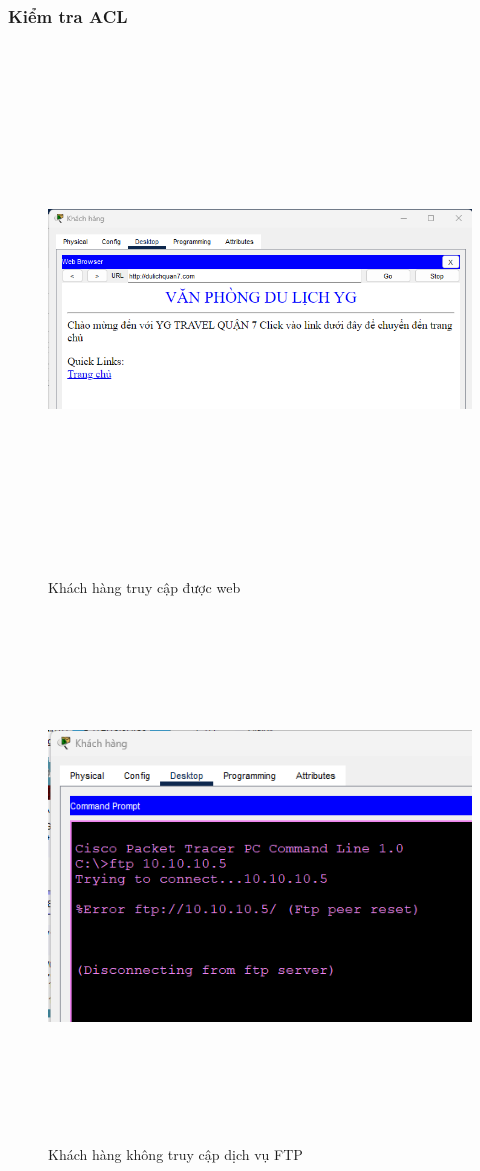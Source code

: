 \documentclass[a4paper, 12pt]{article}
\begin{document}
\subsubsection{Kiểm tra ACL}

\begin{figure}[H]
    \centering
    \includegraphics[width=16cm, height=14cm]{img/4.13.1b.png}
    \caption{Khách hàng truy cập được web }
    \label{hinh4131b}
\end{figure}


\begin{figure}[H]
    \centering
    \includegraphics[width=16cm, height=14cm]{img/4.13.1e.png}
    \caption{Khách hàng không truy cập dịch vụ FTP }
    \label{hinh4131e}
\end{figure}
\end{document}
